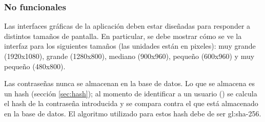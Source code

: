 %
%

\subsubsection{No funcionales}

{
  Las interfaces gráficas de la aplicación deben estar diseñadas para
  responder a distintos tamaños de pantalla. En particular, se debe
  mostrar cómo se ve la interfaz para los siguientes tamaños (las unidades están
  en pixeles): muy grande (1920x1080), grande (1280x800), mediano (900x960),
  pequeño (600x960) y muy pequeño (480x800).
}

{
  Las contraseñas nunca se almacenan en la base de datos. Lo que se almacena es
  un hash (sección \ref{sec:hash}); al momento de identificar a un usuario
  () se calcula el hash de la
  contraseña introducida y se compara contra el que está almacenado en la base
  de datos. El algoritmo utilizado para estos hash debe de ser \gls{gl:sha}-256.
}
